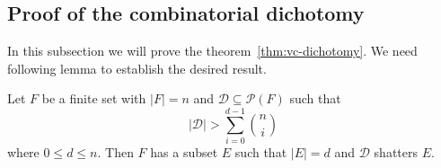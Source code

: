 \subsection{Proof of the combinatorial dichotomy}

In this subsection we will prove the theorem~\ref{thm:vc-dichotomy}. We need following lemma to establish the desired result.

\begin{lemma}
    \label{lem:combinatorial-lemma}
    Let $F$ be a finite set with $|F|=n$ and $\mathcal{D} \subseteq \mathcal{P}(F)$ such that
    \begin{equation}
        \label{eq:assumption-combinatorial-lemma}
        |\mathcal{D}| > \sum_{i=0}^{d-1}\binom{n}{i}
    \end{equation}
    where $0 \leq d \leq n$. Then $F$ has a subset $E$ such that $|E|=d$ and $\mathcal{D}$ shatters $E$.
\end{lemma}

